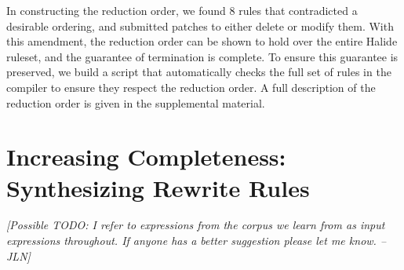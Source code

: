 \documentclass[acmsmall,review]{acmart}\settopmatter{printfolios=true,printccs=false,printacmref=false}
\newcommand{\jln}[1]{\textcolor{uwpurple}{\textit{[{#1} --JLN]}}}
\begin{document}
In constructing the reduction order, we found 8 rules that contradicted a desirable ordering, and submitted patches to either delete or modify them. With this amendment, the reduction order can be shown to hold over the entire Halide ruleset, and the guarantee of termination is complete. To ensure this guarantee is preserved, we build a script that automatically checks the full set of rules in the compiler to ensure they respect the reduction order. A full description of the reduction order is given in the supplemental material.




\section{Increasing Completeness: Synthesizing Rewrite Rules}
\label{sec:completeness}
\jln{Possible TODO: I refer to expressions from the corpus we learn from as input expressions throughout. If anyone has a 
better suggestion please let me know.}
\end{document}

